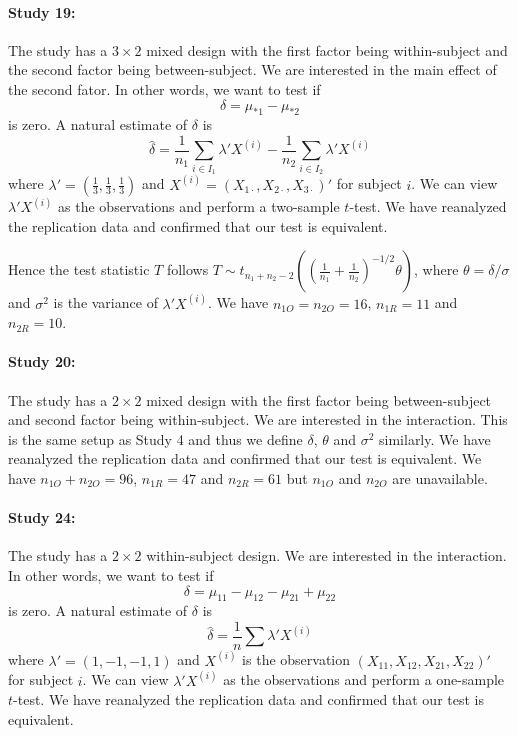 \documentclass[11pt]{article}
\theoremstyle{definition}
\theoremstyle{custom}
\newcommand{\hdelta}{\hat{\delta}}
\begin{document}
  \paragraph{Study 19: \citet{Oberauer:2008kx}}
  The study has a $3 \times 2$ mixed design with the first factor being within-subject and the second factor being between-subject. We are interested in the main effect of the second fator. In other words, we want to test if
  \[
  \delta = \mu_{*1} - \mu_{*2}
  \]
  is zero. A natural estimate of $\delta$ is
  \[
  \hdelta = \frac{1}{n_1} \sum_{i \in I_1} \lambda' X^{(i)} - \frac{1}{n_2} \sum_{i \in I_2} \lambda' X^{(i)}
  \]
  where $\lambda' = (\frac{1}{3}, \frac{1}{3}, \frac{1}{3})$ and $X^{(i)} = (X_{1 \cdot}, X_{2 \cdot}, X_{3 \cdot})'$ for subject $i$. We can view $\lambda' X^{(i)}$ as the observations and perform a two-sample $t$-test. We have reanalyzed the replication data and confirmed that our test is equivalent.

  Hence the test statistic $T$ follows $T \sim t_{n_1 + n_2 - 2}\left(\left(\frac{1}{n_1} + \frac{1}{n_2}\right)^{-1/2} \theta\right)$, where $\theta = \delta / \sigma$ and $\sigma^2$ is the variance of $\lambda' X^{(i)}$. We have $n_{1O} = n_{2O} = 16$, $n_{1R} = 11$ and $n_{2R} = 10$.

  \paragraph{Study 20: \citet{Sahakyan:2008bi}}
  The study has a $2 \times 2$ mixed design with the first factor being between-subject and second factor being within-subject. We are interested in the interaction. This is the same setup as Study 4 and thus we define $\delta$, $\theta$ and $\sigma^2$ similarly. We have reanalyzed the replication data and confirmed that our test is equivalent. We have $n_{1O} + n_{2O} = 96$, $n_{1R} = 47$ and $n_{2R} = 61$ but $n_{1O}$ and $n_{2O}$ are unavailable.

  \paragraph{Study 24: \citet{Bassok:2008kt}}
  The study has a $2 \times 2$ within-subject design. We are interested in the interaction. In other words, we want to test if
  \[
  \delta = \mu_{11} - \mu_{12} - \mu_{21} + \mu_{22}
  \]
  is zero. A natural estimate of $\delta$ is
  \[
  \hdelta = \frac{1}{n} \sum \lambda' X^{(i)}
  \]
  where $\lambda' = (1, -1, -1, 1)$ and $X^{(i)}$ is the observation $(X_{11}, X_{12}, X_{21}, X_{22})'$ for subject $i$. We can view $\lambda' X^{(i)}$ as the observations and perform a one-sample $t$-test. We have reanalyzed the replication data and confirmed that our test is equivalent.
\end{document}
